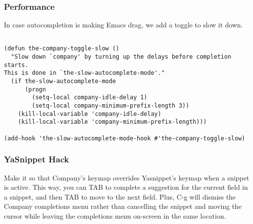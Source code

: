 \documentclass[11pt]{article}
\begin{document}
\subsubsection{Performance}
\label{sec:org6713120}
In case autocompletion is making Emacs drag, we add a toggle to slow
it down.

\begin{verbatim}

(defun the-company-toggle-slow ()
  "Slow down `company' by turning up the delays before completion starts.
This is done in `the-slow-autocomplete-mode'."
  (if the-slow-autocomplete-mode
      (progn
        (setq-local company-idle-delay 1)
        (setq-local company-minimum-prefix-length 3))
    (kill-local-variable 'company-idle-delay)
    (kill-local-variable 'company-minimum-prefix-length)))

(add-hook 'the-slow-autocomplete-mode-hook #'the-company-toggle-slow)
\end{verbatim}

\subsubsection{YaSnippet Hack}
\label{sec:orgdd78636}
Make it so that Company's keymap overrides Yasnippet's keymap when a
snippet is active. This way, you can TAB to complete a suggestion for
the current field in a snippet, and then TAB to move to the next
field. Plus, C-g will dismiss the Company completions menu rather than
cancelling the snippet and moving the cursor while leaving the
completions menu on-screen in the same location.
\end{document}
